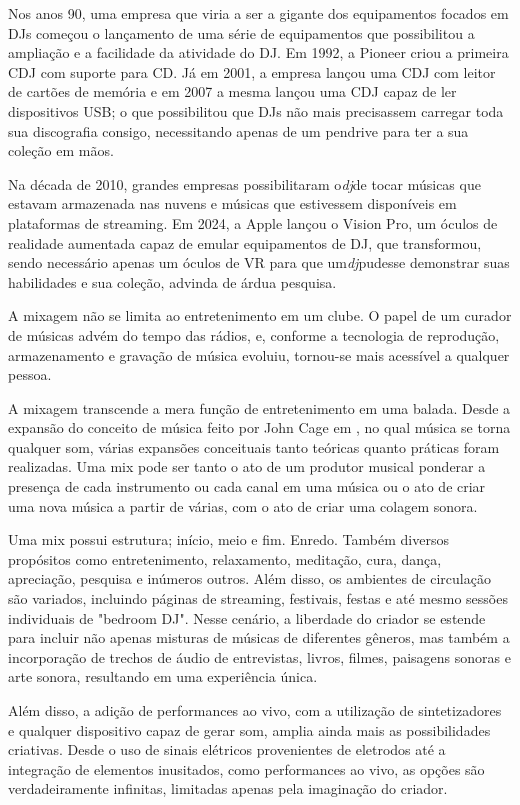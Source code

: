 Nos anos 90, uma empresa que viria a ser a gigante dos equipamentos focados em DJs começou o lançamento de uma série de equipamentos que possibilitou a ampliação e a facilidade da atividade do DJ. Em 1992, a Pioneer criou a primeira CDJ com suporte para CD. Já em 2001, a empresa lançou uma CDJ com leitor de cartões de memória e em 2007 a mesma lançou uma CDJ capaz de ler dispositivos USB; o que possibilitou que DJs não mais precisassem carregar toda sua discografia consigo, necessitando apenas de um pendrive para ter a sua coleção em mãos.
\par
Na década de 2010, grandes empresas possibilitaram o\textit{dj}de tocar músicas que estavam armazenada nas nuvens e músicas que estivessem disponíveis em plataformas de streaming. Em 2024, a Apple lançou o Vision Pro, um óculos de realidade aumentada capaz de emular equipamentos de DJ, que transformou, sendo necessário apenas um óculos de VR para que um\textit{dj}pudesse demonstrar suas habilidades e sua coleção, advinda de árdua pesquisa. 
\par
A mixagem não se limita ao entretenimento em um clube.  O papel de um curador de músicas advém do tempo das rádios, e, conforme a tecnologia de reprodução, armazenamento e gravação de música evoluiu, tornou-se mais acessível a qualquer pessoa. 

A mixagem transcende a mera função de entretenimento em uma balada. Desde a expansão do conceito de música feito por John Cage em \cite{cage}, no qual música se torna qualquer som, várias expansões conceituais tanto teóricas quanto práticas foram realizadas. Uma mix pode ser tanto o ato de um produtor musical ponderar a presença de cada instrumento ou cada canal em uma música ou o ato de criar uma nova música a partir de várias, com o ato de criar uma colagem sonora. 
\par
Uma mix possui estrutura; início, meio e fim. Enredo. Também diversos propósitos como entretenimento, relaxamento, meditação, cura, dança, apreciação, pesquisa e inúmeros outros. Além disso, os ambientes de circulação são variados, incluindo páginas de streaming, festivais, festas e até mesmo sessões individuais de "bedroom DJ". Nesse cenário, a liberdade do criador se estende para incluir não apenas misturas de músicas de diferentes gêneros, mas também a incorporação de trechos de áudio de entrevistas, livros, filmes, paisagens sonoras e arte sonora, resultando em uma experiência única.
\par
Além disso, a adição de performances ao vivo, com a utilização de sintetizadores e qualquer dispositivo capaz de gerar som, amplia ainda mais as possibilidades criativas. Desde o uso de sinais elétricos provenientes de eletrodos até a integração de elementos inusitados, como performances ao vivo, as opções são verdadeiramente infinitas, limitadas apenas pela imaginação do criador.

